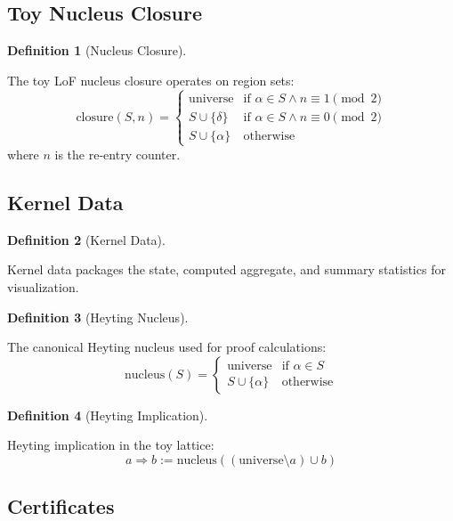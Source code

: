 \documentclass{amsart}
\theoremstyle{definition}
\newtheorem{definition}{Definition}[section]
\theoremstyle{remark}
\begin{document}
\subsection{Toy Nucleus Closure}
\label{sec:toy-nucleus}

\begin{definition}[Nucleus Closure]
\label{def:nucleus-closure}

The toy LoF nucleus closure operates on region sets:
\[
\text{closure}(S, n) = \begin{cases}
\text{universe} & \text{if } \alpha \in S \land n \equiv 1 \pmod{2} \\
S \cup \{\delta\} & \text{if } \alpha \in S \land n \equiv 0 \pmod{2} \\
S \cup \{\alpha\} & \text{otherwise}
\end{cases}
\]
where $n$ is the re-entry counter.
\end{definition}

\subsection{Kernel Data}
\label{sec:kernel-data}

\begin{definition}[Kernel Data]
\label{def:kernel-data}

Kernel data packages the state, computed aggregate, and summary statistics for visualization.
\end{definition}

\begin{definition}[Heyting Nucleus]
\label{def:heyting-nucleus}
\uses{}

The canonical Heyting nucleus used for proof calculations:
\[
\text{nucleus}(S) = \begin{cases}
\text{universe} & \text{if } \alpha \in S \\
S \cup \{\alpha\} & \text{otherwise}
\end{cases}
\]
\end{definition}

\begin{definition}[Heyting Implication]
\label{def:heyting-impl}

Heyting implication in the toy lattice:
\[
a \Rightarrow b := \text{nucleus}((\text{universe} \setminus a) \cup b)
\]
\end{definition}

\subsection{Certificates}
\label{sec:certificates}
\end{document}

